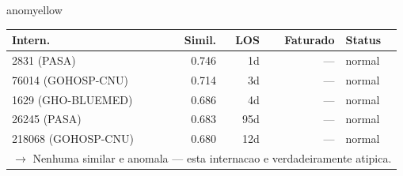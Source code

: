 \documentclass[a4paper,10pt]{article}
\begin{document}
\begin{anomalycard}[Internacao 160333 | PASA | MODERADO (z=2.16)]{anomyellow}
\begin{tabular}{l r r r l}\toprule\textbf{Intern.} & \textbf{Simil.} & \textbf{LOS} & \textbf{Faturado} & \textbf{Status} \\\midrule
2831 (PASA) & 0.746 & 1d & --- & \textcolor{jcubeblue}{normal} \\
76014 (GOHOSP-CNU) & 0.714 & 3d & --- & \textcolor{jcubeblue}{normal} \\
1629 (GHO-BLUEMED) & 0.686 & 4d & --- & \textcolor{jcubeblue}{normal} \\
26245 (PASA) & 0.683 & 95d & --- & \textcolor{jcubeblue}{normal} \\
218068 (GOHOSP-CNU) & 0.680 & 12d & --- & \textcolor{jcubeblue}{normal} \\
\multicolumn{5}{l}{\textcolor{jcubeblue}{\small $\rightarrow$ Nenhuma similar e anomala --- esta internacao e verdadeiramente atipica.}} \\
\bottomrule\end{tabular}



\end{anomalycard}

\newpage
\end{document}
